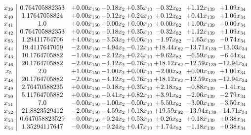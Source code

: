\documentclass[8pt]{article}
\begin{document}
\[\begin{array}{c| c c@{\hskip 2pt} c@{\hskip 2pt} c@{\hskip 2pt} c@{\hskip 2pt} c@{\hskip 2pt} c@{\hskip 2pt} }
 x_{39}   &  0.764705882353 & +  0.00 x_{150} & -0.18 x_{2} & +  0.35 x_{10} & -0.32 x_{82} & +  1.12 x_{139} & +  1.09 x_{34}\\
 x_{40}   &  1.17647058824 & +  0.00 x_{150} & -0.12 x_{2} & +  0.24 x_{10} & +  0.12 x_{82} & +  0.41 x_{139} & +  1.06 x_{34}\\
 x_{41}   &  1.0 & +  0.00 x_{150} & +  0.00 x_{2} & +  0.00 x_{10} & +  0.00 x_{82} & +  1.00 x_{139} & -0.00 x_{34}\\
 x_{42}   &  0.764705882353 & +  0.00 x_{150} & -0.18 x_{2} & +  0.35 x_{10} & -0.32 x_{82} & +  1.12 x_{139} & +  1.09 x_{34}\\
 x_{85}   &  1.29411764706 & +  4.00 x_{150} & -3.53 x_{2} & +  0.06 x_{10} & -1.97 x_{82} & -1.65 x_{139} & -0.74 x_{34}\\
 x_{44}   &  19.4117647059 & -2.00 x_{150} & -4.94 x_{2} & -0.12 x_{10} & + 18.44 x_{82} & -13.71 x_{139} & -13.03 x_{34}\\
 x_{43}   &  10.1764705882 & -1.00 x_{150} & -2.12 x_{2} & +  0.24 x_{10} & +  9.62 x_{82} & -6.59 x_{139} & -6.44 x_{34}\\
 x_{46}   &  20.1764705882 & -2.00 x_{150} & -4.12 x_{2} & -0.76 x_{10} & + 18.12 x_{82} & -12.59 x_{139} & -12.94 x_{34}\\
 x_{5}   &  2.0 & +  1.00 x_{150} & -1.00 x_{2} & +  0.00 x_{10} & -2.00 x_{82} & +  0.00 x_{139} & +  1.00 x_{34}\\
 x_{48}   &  20.1764705882 & -2.00 x_{150} & -4.12 x_{2} & -0.76 x_{10} & + 18.12 x_{82} & -12.59 x_{139} & -12.94 x_{34}\\
 x_{49}   &  2.76470588235 & +  0.00 x_{150} & -0.18 x_{2} & +  0.35 x_{10} & +  2.18 x_{82} & -0.88 x_{139} & -1.41 x_{34}\\
 x_{50}   &  5.11764705882 & +  0.00 x_{150} & -0.41 x_{2} & +  0.82 x_{10} & +  3.91 x_{82} & -2.06 x_{139} & -2.79 x_{34}\\
 x_{51}   &  7.0 & -0.00 x_{150} & -1.00 x_{2} & -0.00 x_{10} & +  5.50 x_{82} & -3.00 x_{139} & -3.50 x_{34}\\
 x_{52}   &  21.8823529412 & -2.00 x_{150} & -4.59 x_{2} & +  0.18 x_{10} & + 19.59 x_{82} & -13.94 x_{139} & -14.71 x_{34}\\
 x_{53}   &  0.647058823529 & -0.00 x_{150} & +  0.24 x_{2} & +  0.53 x_{10} & +  0.26 x_{82} & +  0.18 x_{139} & +  0.38 x_{34}\\
 x_{54}   &  1.35294117647 & -0.00 x_{150} & -0.24 x_{2} & +  0.47 x_{10} & +  1.74 x_{82} & -1.18 x_{139} & -0.38 x_{34}\\

\end{array}\]
\end{document}
